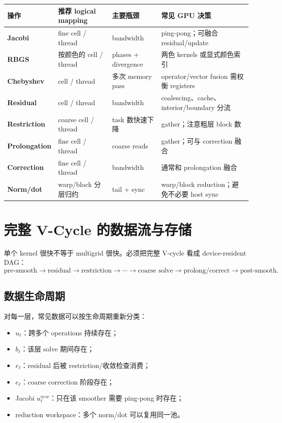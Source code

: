 \begin{center}
\small
\begin{tabularx}{0.98\textwidth}{>{\raggedright\arraybackslash\bfseries}p{2.4cm}>{\raggedright\arraybackslash}p{2.9cm}>{\raggedright\arraybackslash}p{2.5cm}>{\raggedright\arraybackslash}X}
\toprule
操作 & 推荐 logical mapping & 主要瓶颈 & 常见 GPU 决策\\
\midrule
Jacobi & fine cell / thread & bandwidth & ping-pong；可融合 residual/update\\
RBGS & 按颜色的 cell / thread & phases + divergence & 两色 kernels 或显式颜色索引\\
Chebyshev & cell / thread & 多次 memory pass & operator/vector fusion 需权衡 registers\\
Residual & cell / thread & bandwidth & coalescing、cache、interior/boundary 分流\\
Restriction & coarse cell / thread & task 数快速下降 & gather；注意粗层 block 数\\
Prolongation & fine cell / thread & coarse reads & gather；可与 correction 融合\\
Correction & fine cell / thread & bandwidth & 通常和 prolongation 融合\\
Norm/dot & warp/block 分层归约 & tail + sync & warp/block reduction；避免不必要 host sync\\
\bottomrule
\end{tabularx}
\end{center}

\section{完整 V-Cycle 的数据流与存储}
\label{sec:gpu-vcycle-storage}

单个 kernel 很快不等于 multigrid 很快。必须把完整 V-cycle 看成 device-resident DAG：
\begin{equation}
\boxed{
\text{pre-smooth}
\rightarrow
\text{residual}
\rightarrow
\text{restriction}
\rightarrow\cdots\rightarrow
\text{coarse solve}
\rightarrow
\text{prolong/correct}
\rightarrow
\text{post-smooth}.
}
\label{eq:gpu-vcycle-dag}
\end{equation}

\subsection{数据生命周期}

对每一层，常见数据可以按生命周期重新分类：
\begin{itemize}
\item $u_\ell$：跨多个 operations 持续存在；
\item $b_\ell$：该层 solve 期间存在；
\item $r_\ell$：residual 后被 restriction/收敛检查消费；
\item $e_\ell$：coarse correction 阶段存在；
\item Jacobi $u^{new}_\ell$：只在该 smoother 需要 ping-pong 时存在；
\item reduction workspace：多个 norm/dot 可以复用同一池。
\end{itemize}

